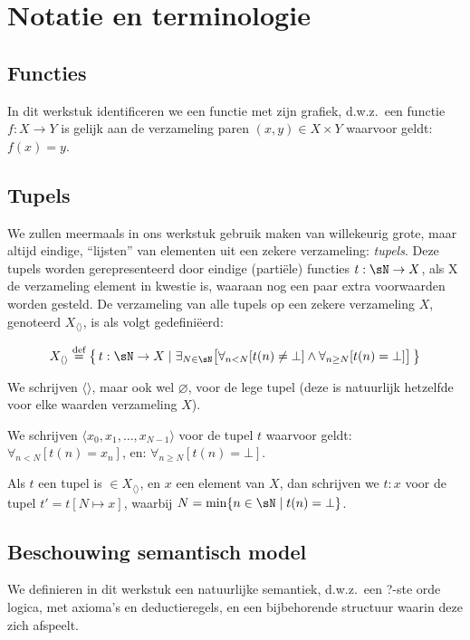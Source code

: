 
\chapter{Notatie en terminologie}

\section{Functies}

In dit werkstuk identificeren we een functie met zijn grafiek, d.w.z.~een functie $f : X \to Y$ is gelijk aan de verzameling paren $(x, y) \in X \times Y$ waarvoor geldt: $f(x) = y$.

\section{Tupels}

We zullen meermaals in ons werkstuk gebruik maken van willekeurig grote, maar altijd eindige, ``lijsten'' van elementen uit een zekere verzameling: \emph{tupels}. Deze tupels worden gerepresenteerd door eindige (partiële) functies $t : \sN \to X$, als X de verzameling element in kwestie is, waaraan nog een paar extra voorwaarden worden gesteld. De verzameling van alle tupels op een zekere verzameling $X$, genoteerd $X_{\langle\rangle}$, is als volgt gedefiniëerd:

$$ X_{\langle\rangle} \DEF \big\{\, t : \sN \to X \mid \exists_{N \in \sN} \big[ \forall_{n < N}[t(n) \neq \bot] \land \forall_{n\ge N}[t(n) = \bot] \big] \,\big\} $$

We schrijven $\langle\rangle$, maar ook wel $\varnothing$, voor de lege tupel (deze is natuurlijk hetzelfde voor elke waarden verzameling $X$).

We schrijven $\langle x_0, x_1, \dots, x_{N-1}\rangle$ voor de tupel $t$ waarvoor geldt: $\forall_{n < N}[t(n) = x_n]$, en: $\forall_{n \ge N}[t(n) = \bot]$.

Als $t$ een tupel is $\in X_{\langle\rangle}$, en $x$ een element van $X$, dan schrijven we $t:x$ voor de tupel $t' = t[N \mapsto x]$, waarbij $N = \min\{n\in\sN \mid t(n) = \bot\}$.

\section{Beschouwing semantisch model}

We definieren in dit werkstuk een natuurlijke semantiek, d.w.z.~een ?-ste orde logica, met axioma's en deductieregels, en een bijbehorende structuur waarin deze zich afspeelt.

